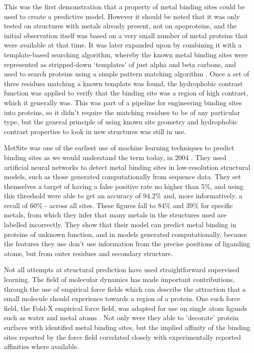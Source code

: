 This was the first demonstration that a property of metal binding sites could be used to create a predictive model. However it should be noted that it was only tested on structures with metals already present, not on apoproteins, and the initial observation itself was based on a very small number of metal proteins that were available at that time. It was later expanded upon by combining it with a template-based searching algorithm, whereby the known metal binding sites were represented as stripped-down `templates' of just alpha and beta carbons, and used to search proteins using a simple pattern matching algorithm \cite{gregory1993prediction}. Once a set of three residues matching a known template was found, the hydrophobic contrast function was applied to verify that the binding site was a region of high contrast, which it generally was. This was part of a pipeline for engineering binding sites into proteins, so it didn't require the matching residues to be of any particular type, but the general principle of using known site geometry and hydrophobic contrast properties to look in new structures was still in use.

MetSite was one of the earliest use of machine learning techniques to predict binding sites as we would understand the term today, in 2004 \cite{sodhi2004predicting}. They used artificial neural networks to detect metal binding sites in low-resolution structural models, such as those generated computationally from sequence data. They set themselves a target of having a false positive rate no higher than 5\%, and using this threshold were able to get an 
accuracy of 94.2\% and, more informatively, a recall of 60\% - across all sites. These figures fall to 84\% and 39\% for specific metals, from which they infer that many metals in the structures used are labelled incorrectly. They show that their model can predict metal binding in proteins of unknown function, and in models generated computationally, because the features they use don't use information from the precise positions of liganding atoms, but from outer residues and secondary structure.

Not all attempts at structural prediction have used straightforward supervised learning. The field of molecular dynamics has made important contributions, through the use of empirical force fields which can describe the attraction that a small molecule should experience towards a region of a protein. One such force field, the Fold-X empirical force field, was adapted for use on single atom ligands such as water and metal atoms . Not only were they able to 'decorate' protein surfaces with identified metal binding sites, but the implied affinity of the binding sites reported by the force field correlated closely with experimentally reported affinities where available.

